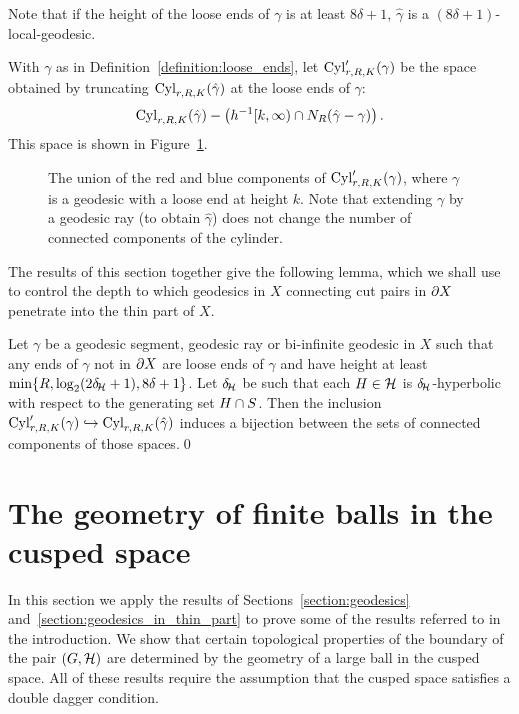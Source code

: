 Note that if the height of the loose ends of $\gamma$ is at least $8\delta + 1$, $\hat\gamma$ is a $(8\delta + 1)$-local-geodesic.

With $\gamma$ as in Definition~\ref{definition:loose_ends}, let $\operatorname{Cyl}_{r, R, K}'(\gamma)$ be the space obtained by truncating $\operatorname{Cyl}_{r, R, K}(\hat\gamma)$ at the loose ends of $\gamma$:
\begin{align}
  \operatorname{Cyl}_{r, R, K}(\hat\gamma) - \left(h^{-1}[k, \infty) \cap N_R (\hat\gamma - \gamma)\right).
\end{align} 
This space is shown in Figure~\ref{figure:geodesic_in_thin_part}.

\begin{figure}
  \begin{center}
    
  \end{center}
  \caption{
    \label{figure:geodesic_in_thin_part}
    The union of the red and blue components of $\operatorname{Cyl}'_{r, R, K}(\gamma)$, where $\gamma$ is a geodesic with a loose end at height $k$. 
    Note that extending $\gamma$ by a geodesic ray (to obtain $\hat\gamma$) does not change the number of connected components of the cylinder.
  }
\end{figure}

The results of this section together give the following lemma, which we shall
use to control the depth to which geodesics in $X$ connecting cut pairs in
$\partial X$ penetrate into the thin part of $X$.

\begin{lemma}\label{lemma:geodesics_in_horoballs} 
  Let $\gamma$ be a geodesic segment, geodesic ray or bi-infinite geodesic in $X$ such that any ends of $\gamma$ not in $\partial X$ are loose ends of $\gamma$ and have height at least $\min\{R, \log_2(2\delta\kern-2pt_{\mathcal{H}} + 1), 8\delta + 1\}$. 
  Let $\delta\kern-2pt_{\mathcal{H}}$ be such that each $H \in \mathcal{H}$ is $\delta\kern-2pt_{\mathcal{H}}$-hyperbolic with respect to the generating set $H \cap S$.  
  Then the inclusion $\operatorname{Cyl}'_{r, R, K}(\gamma) \hookrightarrow \operatorname{Cyl}_{r, R, K}(\hat\gamma)$ induces a bijection between the sets of connected components of those spaces.\qed
\end{lemma}

\section{The geometry of finite balls in the cusped space}\label{section:pumping_lemma}

In this section we apply the results of Sections~\ref{section:geodesics} and~\ref{section:geodesics_in_thin_part} to prove some of the results referred to in the introduction.
We show that certain topological properties of the boundary of the pair $(G, \mathcal{H})$ are determined by the geometry of a large ball in the cusped space.
All of these results require the assumption that the cusped space satisfies a double dagger condition.

